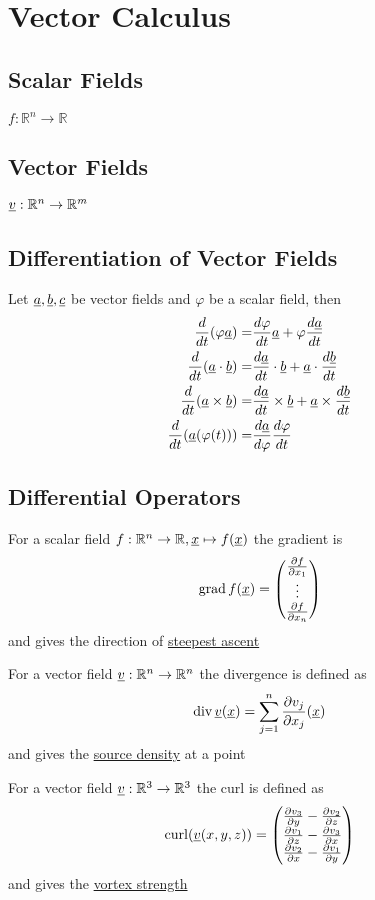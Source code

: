 \section{Vector Calculus}

\subsection*{Scalar Fields}
$f : \mathbb{R}^n \to \mathbb{R}$

\subsection*{Vector Fields}
$\underline{v} : \mathbb{R}^n \to \mathbb{R}^m$

\subsection*{Differentiation of Vector Fields}
Let $\underline{a}, \underline{b}, \underline{c}$ be vector fields and $\varphi$ be a scalar field, then
\[
\begin{aligned}
	\frac{d}{dt} (\varphi \underline{a})= & \frac{d\varphi}{dt}  \underline{a}+ \varphi \frac{d\underline{a}}{dt}\\
	\frac{d}{dt} (\underline{a} \cdot \underline{b})= &  \frac{d\underline{a}}{dt} \cdot \underline{b} +  \underline{a} \cdot \frac{d\underline{b}}{dt}\\
	\frac{d}{dt} (\underline{a} \times \underline{b})= &  \frac{d\underline{a}}{dt} \times \underline{b} +  \underline{a} \times \frac{d\underline{b}}{dt} \\
	\frac{d}{dt} ( \underline{a}(\varphi(t) ) )= & \frac{d\underline{a}}{d\varphi} \frac{d\varphi}{dt} \\
\end{aligned}
\]

\subsection*{Differential Operators}
For a scalar field $f : \mathbb{R}^n \to \mathbb{R}, \underline{x} \mapsto f(\underline{x})$ the gradient is
\[
	\operatorname*{grad} f(\underline{x})  = \begin{pmatrix} \frac{\partial f}{\partial x_1} \\ \vdots \\ \frac{\partial f}{\partial x_n} \end{pmatrix} 
\]
and gives the direction of \ul{steepest ascent}


For a vector field $\underline{v} : \mathbb{R}^n \to \mathbb{R}^n$ the divergence is defined as 
\[
	\operatorname*{div} \underline{v}(\underline{x}) = \sum_{j=1}^n \frac{\partial v_j}{\partial x_j}(\underline{x})
\]
and gives the \ul{source density} at a point

For a vector field $\underline{v} : \mathbb{R}^3 \to \mathbb{R}^3$ the curl is defined as 
\[
	\operatorname*{curl}(\underline{v}(x,y,z)) = \begin{pmatrix} \frac{\partial v_3}{\partial y} - \frac{\partial v_2}{\partial z} \\
						 \frac{\partial v_1}{\partial z} - \frac{\partial v_3}{\partial x}  \\
						 \frac{\partial v_2}{\partial x}  - \frac{\partial v_1}{\partial y} \end{pmatrix}
\]
and gives the \ul{vortex strength}


